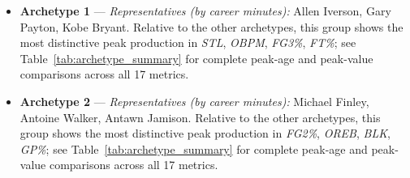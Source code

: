 \begin{itemize}
\item \textbf{Archetype 1} --- \emph{Representatives (by career minutes):} Allen Iverson, Gary Payton, Kobe Bryant. Relative to the other archetypes, this group shows the most distinctive peak production in \textit{STL}, \textit{OBPM}, \textit{FG3\%}, \textit{FT\%}; see Table~\ref{tab:archetype_summary} for complete peak-age and peak-value comparisons across all 17 metrics.
\item \textbf{Archetype 2} --- \emph{Representatives (by career minutes):} Michael Finley, Antoine Walker, Antawn Jamison. Relative to the other archetypes, this group shows the most distinctive peak production in \textit{FG2\%}, \textit{OREB}, \textit{BLK}, \textit{GP\%}; see Table~\ref{tab:archetype_summary} for complete peak-age and peak-value comparisons across all 17 metrics.
\end{itemize}
